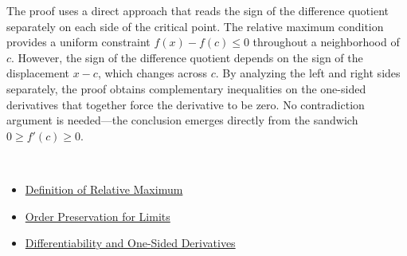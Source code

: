 \begin{remark*}
The proof uses a direct approach that reads the sign of the difference quotient separately on each side of the critical point. The relative maximum condition provides a uniform constraint $f(x) - f(c) \leq 0$ throughout a neighborhood of $c$. However, the sign of the difference quotient depends on the sign of the displacement $x - c$, which changes across $c$. By analyzing the left and right sides separately, the proof obtains complementary inequalities on the one-sided derivatives that together force the derivative to be zero. No contradiction argument is needed—the conclusion emerges directly from the sandwich $0 \geq f'(c) \geq 0$.
\end{remark*}

\begin{remark*}[Dependencies]~\\
\begin{itemize}
  \item \hyperref[def:relative-maximum]{Definition of Relative Maximum}
  \item \hyperref[thm:order-preservation-limits]{Order Preservation for Limits}
  \item \hyperref[thm:differentiability-one-sided]{Differentiability and One-Sided Derivatives}
\end{itemize}
\end{remark*}

\clearpage

